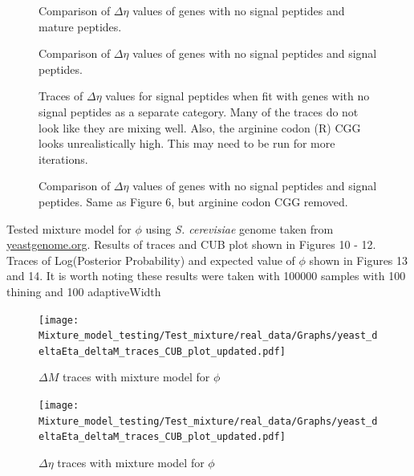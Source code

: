 \documentclass[11pt]{labbook}
\begin{document}
\begin{figure}[H]
\caption{Comparison of $\Delta\eta$ values of genes with no signal peptides and mature peptides.}
\end{figure}

\begin{figure}[H]
\caption{Comparison of $\Delta\eta$ values of genes with no signal peptides and signal peptides.}
\end{figure}

\begin{figure}[H]
\caption{Traces of $\Delta\eta$ values for signal peptides when fit with genes with no signal peptides as a separate category. Many of the traces do not look like they are mixing well. Also, the arginine codon (R) CGG looks unrealistically high. This may need to be run for more iterations.}
\end{figure}

\begin{figure}[H]
\caption{Comparison of $\Delta\eta$ values of genes with no signal peptides and signal peptides. Same as Figure 6, but arginine codon CGG removed.}
\end{figure}


Tested mixture model for $\phi$ using \textit{S. cerevisiae} genome taken from \underline{yeastgenome.org}. Results of traces and CUB plot shown in Figures 10 - 12. Traces of Log(Posterior Probability) and expected value of $\phi$ shown in Figures 13 and 14. It is worth noting these results were taken with 100000 samples with 100 thining and 100 adaptiveWidth

\begin{figure}[H]
\centering
\texttt{[image: Mixture\_model\_testing/Test\_mixture/real\_data/Graphs/yeast\_deltaEta\_deltaM\_traces\_CUB\_plot\_updated.pdf]}
\caption{$\Delta\mathit{M}$ traces with mixture model for $\phi$}
\end{figure}

\begin{figure}[H]
\centering
\texttt{[image: Mixture\_model\_testing/Test\_mixture/real\_data/Graphs/yeast\_deltaEta\_deltaM\_traces\_CUB\_plot\_updated.pdf]}
\caption{$\Delta\eta$ traces with mixture model for $\phi$}
\end{figure}
\end{document}
